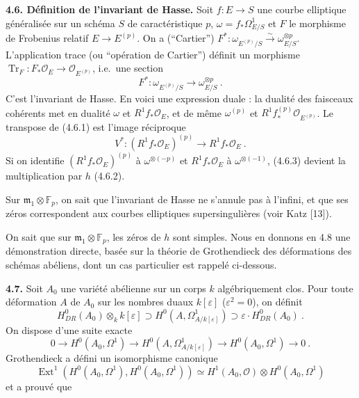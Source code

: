 \documentclass[10pt,a4paper]{amsart}
\theoremstyle{plain}
\theoremstyle{definition}
\newcommand{\m}{\mathfrak{m}}
\newcommand{\FF}{\mathbb{F}}
\DeclareMathOperator{\Tr}{Tr}
\DeclareMathOperator{\Ext}{Ext}
\begin{document}
\medskip\noindent\textbf{4.6. D\'efinition de l'invariant de Hasse.} Soit $f : E \to S$ une courbe elliptique g\'en\'eralis\'ee sur un sch\'ema $S$ de caract\'eristique $p$, $\omega = f_* \Omega^1_{E/S}$ et $F$ le morphisme de Frobenius relatif $E \to E^{(p)}$. On a (``Cartier'') $F^* : \omega_{E^{(p)}/S} \xrightarrow{\sim} \omega_{E/S}^{\otimes p}$. L'application trace (ou ``op\'eration de Cartier'') d\'efinit un morphisme $\Tr_F : F_* \mathcal{O}_E \to \mathcal{O}_{E^{(p)}}$, i.e.\ une section
\begin{equation}
F^* : \omega_{E^{(p)}/S} \to \omega_{E/S}^{\otimes p}\ .
\end{equation}
C'est l'invariant de Hasse. En voici une expression duale : la dualit\'e des faisceaux coh\'erents met en dualit\'e $\omega$ et $R^1 f_* \mathcal{O}_E$, et de m\^eme $\omega^{(p)}$ et $R^1 f_*^{(p)} \mathcal{O}_{E^{(p)}}$. Le transpose de (4.6.1) est l'image r\'eciproque
\begin{equation}
V^* : (R^1 f_* \mathcal{O}_E)^{(p)} \to R^1 f_* \mathcal{O}_E\ .
\end{equation}
Si on identifie $(R^1 f_* \mathcal{O}_E)^{(p)}$ \`a $\omega^{\otimes(-p)}$ et $R^1 f_* \mathcal{O}_E$ \`a $\omega^{\otimes(-1)}$, (4.6.3) devient la multiplication par $h$ (4.6.2).

Sur $\m_1 \otimes \FF_p$, on sait que l'invariant de Hasse ne s'annule pas \`a l'infini, et que ses z\'eros correspondent aux courbes elliptiques supersinguli\`eres (voir Katz [13]).

On sait que sur $\m_1 \otimes \FF_p$, les z\'eros de $h$ sont simples. Nous en donnons en 4.8 une d\'emonstration directe, bas\'ee sur la th\'eorie de Grothendieck des d\'eformations des sch\'emas ab\'eliens, dont un cas particulier est rappel\'e ci-dessous.

\medskip\noindent\textbf{4.7.} Soit $A_0$ une vari\'et\'e ab\'elienne sur un corps $k$ alg\'ebriquement clos. Pour toute d\'eformation $A$ de $A_0$ sur les nombres duaux $k[\varepsilon]$ ($\varepsilon^2 = 0$), on d\'efinit
\begin{equation}
H^0_{DR}(A_0) \otimes_k k[\varepsilon] \supset H^0(A, \Omega^1_{A/k[\varepsilon]}) \supset \varepsilon \cdot H^0_{DR}(A_0)\ .
\end{equation}
On dispose d'une suite exacte
\begin{equation}
0 \to H^0(A_0, \Omega^1) \to H^0(A, \Omega^1_{A/k[\varepsilon]}) \to H^0(A_0, \Omega^1) \to 0\ .
\end{equation}
Grothendieck a d\'efini un isomorphisme canonique
\begin{equation}
\Ext^1(H^0(A_0, \Omega^1), H^0(A_0, \Omega^1)) \simeq H^1(A_0, \mathcal{O}) \otimes H^0(A_0, \Omega^1)
\end{equation}
et a prouv\'e que
\end{document}
